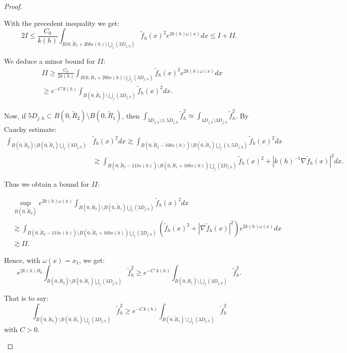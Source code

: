 \documentclass[leqno,11pt,letterpaper, english]{amsart}
\newcommand{\nn}{\nonumber}
\theoremstyle{plain}
\theoremstyle{definition}
\numberwithin{equation}{section}
\begin{document}
\begin{proof}
\begin{itemize}
		With the precedent inequality we get:		
		\begin{equation}
			2I \leq \frac{C_0}{k(h)}\int_{B(0,\tilde{R}_1+20h\epsilon(h)\setminus\bigcup_j(3D_{j,h})} \tilde{f}_h(x)^2 e^{2k(h)\omega(x)}dx \leq I + II.
		\end{equation}
		
		We deduce a minor bound for $II$: 		
			\begin{align}
				& II\geq  \frac{C_0}{2k(h)}\int_{B(0,\tilde{R}_1+20h\epsilon(h)\setminus\bigcup_j(3D_{j,h})} \tilde{f}_h(x)^2 e^{2k(h)\omega(x)}dx\nn\\
				&\geq e^{-C' k(h)}\int_{B(0,\tilde{R}_1)\setminus\bigcup_j(3D_{j,h})} \tilde{f}_h(x)^2dx.
			\end{align}
			
Now, if $5D_{j,h}\subset B(0,\tilde{R}_2)\setminus B(0,\tilde{R}_1)$, then $\int_{3D_{j,h}\setminus 1,5D_{j,h}}\tilde{f}_h^2\simeq \int_{4D_{j,h}\setminus 3D_{j,h}}\tilde{f}_h^2$. By Cauchy estimate:
			\begin{align}
				\int_{B(0,\tilde{R}_2)\setminus B(0,\tilde{R}_1) \bigcup_j(3D_{j,h})} &\tilde{f}_h(x)^2dx  \gtrsim\int_{B(0,\tilde{R}_2-10h\epsilon(h))\setminus B(0,\tilde{R}_1) \bigcup_j(1,5D_{j,h})}\tilde{f}_h(x)^2dx\nn\\
				&\gtrsim \int_{B(0,\tilde{R}_2-11h\epsilon(h))\setminus B(0,\tilde{R}_1+10h\epsilon(h)) \bigcup_j(2D_{j,h})} \tilde{f}_h(x)^2+|k(h)^{-1}\nabla \tilde{f}_h(x)|^2dx.
			\end{align}
			
			Thus we obtain a bound for $II$:
			
			\begin{align}
				&\sup_{B(0,\tilde{R}_0)}e^{2k(h)\omega(x)}\int_{B(0,\tilde{R}_2)\setminus B(0,\tilde{R}_1) \bigcup_j(3D_{j,h})} \tilde{f}_h(x)^2dx\nn\\
				&\gtrsim\int_{B(0,\tilde{R}_2-11h\epsilon(h))\setminus B(0,\tilde{R}_1+10h\epsilon(h)) \bigcup_j(2D_{j,h})} (\tilde{f}_h(x)^2+|\nabla \tilde{f}_h(x)|^2)e^{2k(h)\omega(x)}dx\nn\\
				&\gtrsim II.
			\end{align}
			
			Hence, with $\omega(x)=x_1$, we get:
			\begin{equation}
			e^{2k(h)R_0}\int_{B(0,\tilde{R}_2)\setminus B(0,\tilde{R}_1) \bigcup_j(3D_{j,h})} \tilde{f}_h^2\geq e^{-C'\,k(h)}\int_{ B(0,\tilde{R}_1)\setminus \bigcup_j(3D_{j,h})} \tilde{f}_h^2.
			\end{equation}
			
			That is to say:
			\begin{equation}
			\int_{B(0,\tilde{R}_2)\setminus B(0,\tilde{R}_1) \bigcup_j(3D_{j,h})} \tilde{f}_h^2\geq e^{-C\,k(h)}\int_{ B(0,\tilde{R}_1)\setminus \bigcup_j(3D_{j,h})} \tilde{f}_h^2
			\end{equation}
			with $C>0$.
		\end{itemize}
		
		
	\end{proof}
\end{document}
